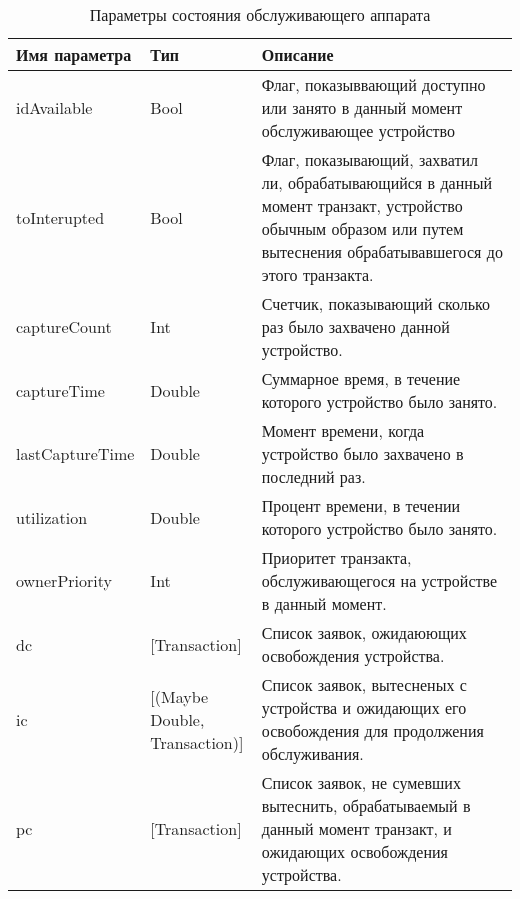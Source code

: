 \begin{table}
\caption{Параметры состояния обслуживающего аппарата}
\label{tab:facState}
\begin{tabular}{|l|l|p{}|}
\hline
Имя параметра & Тип & Описание \\
\hline
idAvailable & Bool & Флаг, показыввающий доступно или занято в данный момент обслуживающее устройство\\
\hline
toInterupted & Bool & Флаг, показывающий, захватил ли, обрабатывающийся в данный момент транзакт, устройство обычным образом или путем вытеснения обрабатывавшегося до этого транзакта.\\
\hline
captureCount & Int & Счетчик, показывающий сколько раз было захвачено данной устройство.\\
\hline
captureTime & Double & Суммарное время, в течение которого устройство было занято.\\
\hline
lastCaptureTime & Double & Момент времени, когда устройство было захвачено в последний раз.\\
\hline
utilization & Double & Процент времени, в течении которого устройство было занято.\\
\hline
ownerPriority & Int & Приоритет транзакта, обслуживающегося на устройстве в данный момент. \\
\hline
dc & [Transaction] & Список заявок, ожидаюющих освобождения устройства. \\
\hline
ic & \parbox{25mm}{[(Maybe Double,\\Transaction)] }  & Список заявок, вытесненых с устройства и ожидающих его освобождения для продолжения обслуживания.\\
\hline
pc & [Transaction] & Список заявок, не сумевших вытеснить, обрабатываемый в данный момент транзакт, и ожидающих освобождения устройства.\\
\hline
\end{tabular}
\end{table}


